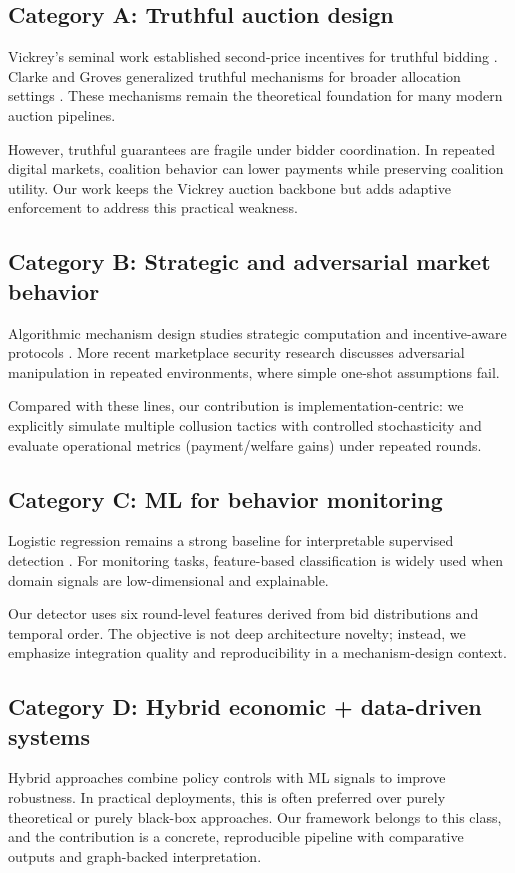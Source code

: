 \documentclass[journal]{IEEEtran}
\begin{document}
\subsection{Category A: Truthful auction design}
Vickrey's seminal work established second-price incentives for truthful bidding \cite{vickrey}. Clarke and Groves generalized truthful mechanisms for broader allocation settings \cite{clarke,groves}. These mechanisms remain the theoretical foundation for many modern auction pipelines.

However, truthful guarantees are fragile under bidder coordination. In repeated digital markets, coalition behavior can lower payments while preserving coalition utility. Our work keeps the Vickrey auction backbone but adds adaptive enforcement to address this practical weakness.

\subsection{Category B: Strategic and adversarial market behavior}
Algorithmic mechanism design studies strategic computation and incentive-aware protocols \cite{nisan}. More recent marketplace security research discusses adversarial manipulation in repeated environments, where simple one-shot assumptions fail.

Compared with these lines, our contribution is implementation-centric: we explicitly simulate multiple collusion tactics with controlled stochasticity and evaluate operational metrics (payment/welfare gains) under repeated rounds.

\subsection{Category C: ML for behavior monitoring}
Logistic regression remains a strong baseline for interpretable supervised detection \cite{hosmer,sklearn}. For monitoring tasks, feature-based classification is widely used when domain signals are low-dimensional and explainable.

Our detector uses six round-level features derived from bid distributions and temporal order. The objective is not deep architecture novelty; instead, we emphasize integration quality and reproducibility in a mechanism-design context.

\subsection{Category D: Hybrid economic + data-driven systems}
Hybrid approaches combine policy controls with ML signals to improve robustness. In practical deployments, this is often preferred over purely theoretical or purely black-box approaches. Our framework belongs to this class, and the contribution is a concrete, reproducible pipeline with comparative outputs and graph-backed interpretation.
\end{document}
